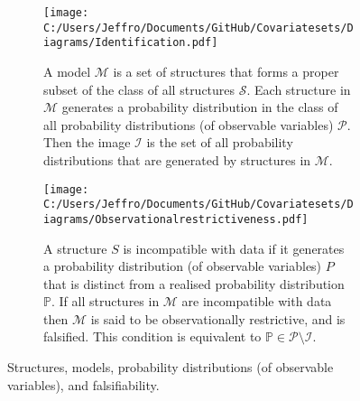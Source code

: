 \documentclass[10pt,a4paper,twoside]{article}
\numberwithin{equation}{section}
\begin{document}
\begin{figure}[p]
\centering
\begin{subfigure}{0.8\textwidth}
  \centering
  \texttt{[image: C:/Users/Jeffro/Documents/GitHub/Covariatesets/Diagrams/Identification.pdf]}
  \caption{A model $\mathcal{M}$ is a set of structures that forms a proper subset of the class of all structures $\mathcal{S}$. Each structure in $\mathcal{M}$ generates a probability distribution in the class of all probability distributions (of observable variables) $\mathcal{P}$. Then the image $\mathcal{I}$ is the set of all probability distributions that are generated by structures in $\mathcal{M}$.}
  \label{fig:model}
  \end{subfigure}
\begin{subfigure}{0.8\textwidth}
  \centering
  \texttt{[image: C:/Users/Jeffro/Documents/GitHub/Covariatesets/Diagrams/Observationalrestrictiveness.pdf]}
  \caption{A structure $S$ is incompatible with data if it generates a probability distribution (of observable variables) $P$ that is distinct from a realised probability distribution $\mathbb{P}$. If all structures in $\mathcal{M}$ are incompatible with data then $\mathcal{M}$ is said to be observationally restrictive, and is falsified. This condition is equivalent to $\mathbb{P}\in\mathcal{P}\setminus\mathcal{I}$.}
  \label{fig:obs.restrict}
  \end{subfigure}
\caption{Structures, models, probability distributions (of observable variables), and falsifiability.}
\label{fig:models}
\end{figure}
\end{document}

